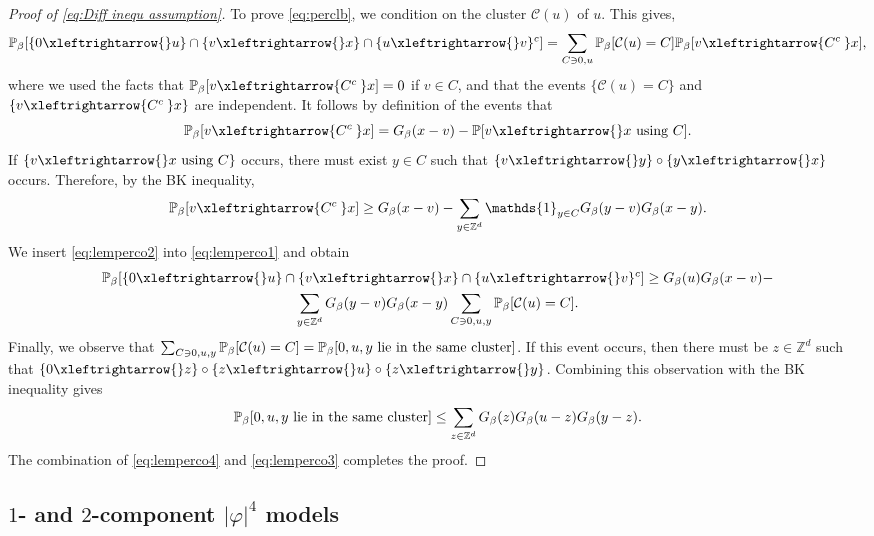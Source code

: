 \documentclass[11pt,a4paper]{article}
\numberwithin{equation}{section}
\theoremstyle{plain}
\theoremstyle{definition}
\newcommand\1{\mathds{1}}
\newcommand{\connect}{\xleftrightarrow}
\begin{document}
\begin{proof}[Proof of \eqref{eq:Diff inequ assumption}]
To prove \eqref{eq:perclb},
we condition on the cluster $\mathcal C(u)$ of $u$.
This gives,
    \begin{align}\label{eq:lemperco1}
              \mathbb P_{\beta} [ \{0 \connect{} u\}\cap  \{v \connect{} x\}\cap  \{u \connect{} v\}^c] = \sum_{C\ni 0,u} \mathbb P_{\beta}[ \mathcal C(u)=C]\mathbb P_\beta[v\connect{C^c\:}x],
              \end{align}
where we used the facts that $\mathbb P_\beta[v\connect{C^c\:}x]=0$ if $v\in C$, and that the events $\{\mathcal C(u)=C\}$ and $\{v\connect{C^c\:}x\}$ are independent.
It follows by definition of the events that
\begin{equation}
	\mathbb P_\beta[v\connect{C^c\:}x]=G_\beta(x-v)-\mathbb P[v\connect{}x \textup{ using }C].
\end{equation}
If $\{v\connect{}x \textup{ using }C\}$ occurs, there must exist $y\in C$ such that $\{v\connect{} y\}\circ \{y\connect{} x\}$ occurs.
Therefore, by the BK inequality,
    \begin{align}\label{eq:lemperco2}
        \mathbb P_\beta[v\connect{C^c\:}x] \geq G_\beta(x-v)- \sum_{y \in \mathbb Z^d}\mathds{1}_{y\in C} G_\beta(y-v) G_\beta(x-y).
    \end{align}
    We insert \eqref{eq:lemperco2} into \eqref{eq:lemperco1} and obtain
    \begin{multline}\label{eq:lemperco3}
    	 \mathbb P_{\beta} [ \{0 \connect{} u\}\cap  \{v \connect{} x\}\cap  \{u \connect{} v\}^c]\geq G_\beta(u)G_\beta(x-v)
    	 -\\\sum_{y\in \mathbb Z^d}G_\beta(y-v)G_\beta(x-y)\sum_{C\ni 0,u,y}\mathbb P_\beta[\mathcal C(u)=C].
    \end{multline}
    Finally, we observe that $\sum_{C\ni 0,u,y}\mathbb P_\beta[\mathcal C(u)=C]=\mathbb P_\beta[0,u,y\textup{ lie in the same cluster}]$. If this event occurs, then there must be $z\in \mathbb Z^d$ such that $\{ 0 \connect{} z\}\circ\{ z \connect{} u\} \circ\{ z\connect{}y\}$. Combining this observation with the BK inequality gives
    \begin{equation}\label{eq:lemperco4}
    	\mathbb P_\beta[0,u,y\textup{ lie in the same cluster}]\leq \sum_{z\in \mathbb Z^d}G_\beta(z)G_\beta(u-z)G_\beta(y-z).
    \end{equation}
    The combination of \eqref{eq:lemperco4} and \eqref{eq:lemperco3} completes the proof.
\end{proof}


\subsection{$1$- and $2$-component $|\varphi|^4$ models}
\label{sec:phi4}
\end{document}
